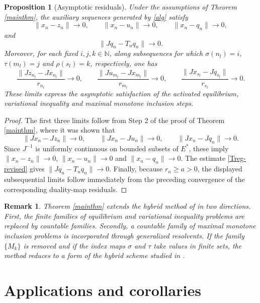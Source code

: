 \documentclass[10pt,a4paper]{amsart}
\newtheorem{proposition}[theorem]{Proposition}
\newtheorem{remark}[theorem]{Remark}
\numberwithin{equation}{section}
\begin{document}
\begin{proposition}[Asymptotic residuals]\label{residualprop}
Under the assumptions of Theorem \ref{mainthm}, the auxiliary sequences generated by \eqref{alg} satisfy
\[
\|x_n-z_n\|\to0,\qquad \|x_n-u_n\|\to0,\qquad \|x_n-q_n\|\to0,
\]
and
\[
\|Jq_n-T_nq_n\|\to0.
\]
Moreover, for each fixed $i,j,k\in\mathbb N$, along subsequences for which $\sigma(n_l)=i$, $\tau(m_l)=j$ and $\rho(s_l)=k$, respectively, one has
\[
\frac{\|Jz_{n_l}-Jx_{n_l}\|}{r_{n_l}}\to0,\qquad
\frac{\|Ju_{m_l}-Jx_{m_l}\|}{r_{m_l}}\to0,\qquad
\frac{\|Jx_{s_l}-Jq_{s_l}\|}{r_{s_l}}\to0.
\]
These limits express the asymptotic satisfaction of the activated equilibrium, variational inequality and maximal monotone inclusion steps.
\end{proposition}

\begin{proof}
The first three limits follow from Step 2 of the proof of Theorem \ref{mainthm}, where it was shown that
\[
\|Jx_n-Jz_n\|\to0,\qquad \|Jx_n-Ju_n\|\to0,\qquad \|Jx_n-Jq_n\|\to0.
\]
Since $J^{-1}$ is uniformly continuous on bounded subsets of $E^{*}$, these imply $\|x_n-z_n\|\to0$, $\|x_n-u_n\|\to0$ and $\|x_n-q_n\|\to0$. The estimate \eqref{Treg-revised} gives $\|Jq_n-T_nq_n\|\to0$. Finally, because $r_n\geq a>0$, the displayed subsequential limits follow immediately from the preceding convergence of the corresponding duality-map residuals.
\end{proof}

\begin{remark}
Theorem \ref{mainthm} extends the hybrid method of \cite{UbaCarpathian2023} in two directions. First, the finite families of equilibrium and variational inequality problems are replaced by countable families. Secondly, a countable family of maximal monotone inclusion problems is incorporated through generalized resolvents. If the family $\{M_k\}$ is removed and if the index maps $\sigma$ and $\tau$ take values in finite sets, the method reduces to a form of the hybrid scheme studied in \cite{UbaCarpathian2023}.
\end{remark}

\section{Applications and corollaries}
\end{document}

